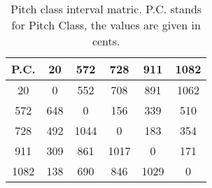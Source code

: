 \begin{table}
\begin{tabular}{c||  c  c  c  c  c  }	
P.C. & 20 & 572 & 728 & 911 & 1082 \\
\hline
\hline
20 & 0 & 552 & 708 & 891 & 1062\\
572 & 648 & 0 & 156 & 339 & 510\\
728 & 492 & 1044 & 0 & 183 & 354\\
911 & 309 & 861 & 1017 & 0 & 171\\
1082 & 138 & 690 & 846 & 1029 & 0     	
\end{tabular}
\label{tbl:pitch_class_interval_matrix}
\caption{Pitch class interval matric. P.C. stands for Pitch Class, the values are given in cents.}
\end{table}
